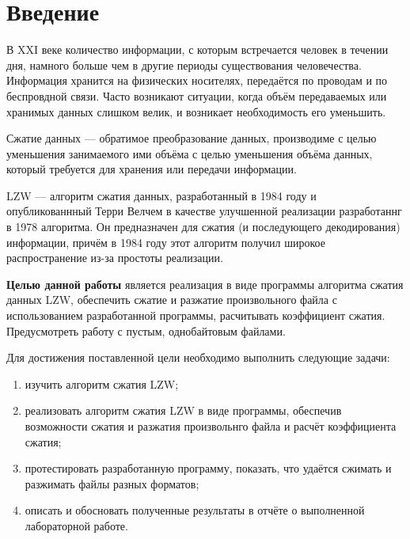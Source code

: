 \chapter*{Введение}

В XXI веке количество информации, с которым встречается человек в течении дня, намного больше чем в другие периоды существования человечества. Информация хранится на физических носителях, передаётся по проводам и по беспровдной связи. Часто возникают ситуации, когда объём передаваемых или хранимых данных слишком велик, и возникает необходимость его уменьшить.

Сжатие данных --- обратимое преобразование данных, производиме с целью уменьшения занимаемого ими объёма с целью уменьшения объёма данных, который требуется для хранения или передачи информации.

LZW --- алгоритм сжатия данных, разработанный в 1984 году и опубликованнный Терри Велчем в качестве улучшенной реализации разработаннг в 1978 алгоритма. Он предназначен для сжатия (и последующего декодирования) информации, причём в 1984 году этот алгоритм получил широкое распространение из-за простоты реализации.

\textbf{Целью данной работы} является реализация в виде программы алгоритма сжатия данных LZW, обеспечить сжатие и разжатие произвольного файла с использованием разработанной программы, расчитывать коэффициент сжатия. Предусмотреть работу с пустым, однобайтовым файлами.

Для достижения поставленной цели необходимо выполнить следующие задачи:
\begin{enumerate}[label=\arabic*)]
	\item изучить алгоритм сжатия LZW;
    \item реализовать алгоритм сжатия LZW в виде программы, обеспечив возможности сжатия и разжатия произвольнго файла и расчёт коэффициента сжатия;
	\item протестировать разработанную программу, показать, что удаётся сжимать и разжимать файлы разных форматов;
	\item описать и обосновать полученные результаты в отчёте о выполненной лабораторной работе.
\end{enumerate}

